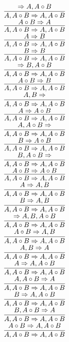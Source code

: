 \documentclass[11pt]{article}
\begin{document}
\begin{center}
\bigskip
\\$\infer{A, A\circ B\Rightarrow A, A\circ B}{\Rightarrow A, A\circ B}$
\bigskip
\\$\infer{A, A\circ B\Rightarrow A, A\circ B}{A\circ B\Rightarrow A}$
\bigskip
\\$\infer{A, A\circ B\Rightarrow A, A\circ B}{A\Rightarrow B}$
\bigskip
\\$\infer{A, A\circ B\Rightarrow A, A\circ B}{B\Rightarrow B}$
\bigskip
\\$\infer{A, A\circ B\Rightarrow A, A\circ B}{\Rightarrow B, A\circ B}$
\bigskip
\\$\infer{A, A\circ B\Rightarrow A, A\circ B}{A\circ B\Rightarrow B}$
\bigskip
\\$\infer{A, A\circ B\Rightarrow A, A\circ B}{A, B\Rightarrow }$
\bigskip
\\$\infer{A, A\circ B\Rightarrow A, A\circ B}{A\Rightarrow A\circ B}$
\bigskip
\\$\infer{A, A\circ B\Rightarrow A, A\circ B}{A, A\circ B\Rightarrow }$
\bigskip
\\$\infer{A, A\circ B\Rightarrow A, A\circ B}{B\Rightarrow A\circ B}$
\bigskip
\\$\infer{A, A\circ B\Rightarrow A, A\circ B}{B, A\circ B\Rightarrow }$
\bigskip
\\$\infer{A, A\circ B\Rightarrow A, A\circ B}{A\circ B\Rightarrow A\circ B}$
\bigskip
\\$\infer{A, A\circ B\Rightarrow A, A\circ B}{A\Rightarrow A, B}$
\bigskip
\\$\infer{A, A\circ B\Rightarrow A, A\circ B}{B\Rightarrow A, B}$
\bigskip
\\$\infer{A, A\circ B\Rightarrow A, A\circ B}{\Rightarrow A, B, A\circ B}$
\bigskip
\\$\infer{A, A\circ B\Rightarrow A, A\circ B}{A\circ B\Rightarrow A, B}$
\bigskip
\\$\infer{A, A\circ B\Rightarrow A, A\circ B}{A, B\Rightarrow A}$
\bigskip
\\$\infer{A, A\circ B\Rightarrow A, A\circ B}{A\Rightarrow A, A\circ B}$
\bigskip
\\$\infer{A, A\circ B\Rightarrow A, A\circ B}{A, A\circ B\Rightarrow A}$
\bigskip
\\$\infer{A, A\circ B\Rightarrow A, A\circ B}{B\Rightarrow A, A\circ B}$
\bigskip
\\$\infer{A, A\circ B\Rightarrow A, A\circ B}{B, A\circ B\Rightarrow A}$
\bigskip
\\$\infer{A, A\circ B\Rightarrow A, A\circ B}{A\circ B\Rightarrow A, A\circ B}$

\end{center}
\end{document}
